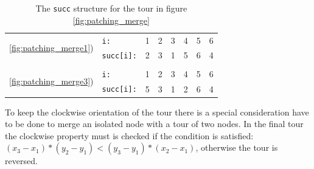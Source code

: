 \begin{table}[h]
	\centering
	\caption{The \texttt{succ} structure for the tour in figure \ref{fig:patching_merge}}
	\begin{tabular}{clcccccc}
		\multirow{2}{*}{\ref{fig:patching_merge1})} 	& \texttt{i:}		& 1 & 2 & 3 & 4 & 5 & 6 \\
														& \texttt{succ[i]:}	& 2 & 3 & 1 & 5 & 6 & 4 \\
														&		   			&   &   &   &   &   &   \\
		\multirow{2}{*}{\ref{fig:patching_merge3})} 	& \texttt{i:}		& 1 & 2 & 3 & 4 & 5 & 6 \\
														& \texttt{succ[i]:}	& 5 & 3 & 1 & 2 & 6 & 4 \\
	\end{tabular}
\end{table}
To keep the clockwise orientation of the tour there is a special consideration have to be done to merge an isolated node with a tour of two nodes. In the final tour the clockwise property must is checked if the condition is satisfied:
$ (x_3 - x_1)*(y_2 - y_1) < (y_3 - y_1)*(x_2 - x_1) $,
otherwise the tour is reversed.
